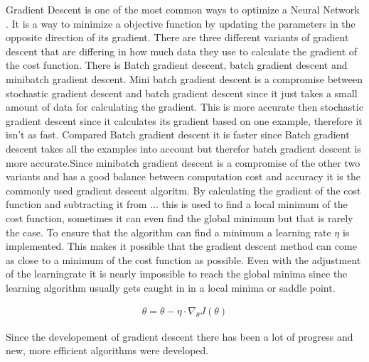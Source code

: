 \documentclass[
a4paper, 
12pt,
grayscalebody, %
abstract=on,
twoside, BCOR10mm, 12pt, DIV13,headinclude, footexclude, final, abstracton, openright
]{ibireprt}
\numberwithin{equation}{chapter}
\numberwithin{table}{chapter}
\numberwithin{figure}{chapter}
\numberwithin{algorithm}{chapter}
\numberwithin{example}{chapter}
\numberwithin{example}{chapter}
\begin{document}
Gradient Descent is one of the most common ways to optimize a Neural Network \cite{Ruder2016}. It is a way to minimize a objective function by updating the parameters in the opposite direction of its gradient. There are three different variants of gradient descent that are differing in how much data they use to calculate the gradient of the cost function. There is Batch gradient descent, batch gradient descent and minibatch gradient descent. Mini batch gradient descent is a compromise between stochastic gradient descent and batch gradient descent since it just takes a small amount of data for calculating the gradient. This is more accurate then stochastic gradient descent since it calculates its gradient based on one example, therefore it isn't as fast. Compared Batch gradient descent it is faster since Batch gradient descent takes all the examples into account but therefor batch gradient descent is more accurate.Since minibatch gradient descent is a compromise of the other two variants and has a good balance between computation cost and accuracy it is the commonly used gradient descent algoritm. By calculating the gradient of the cost function and subtracting it from ... %
 this is used to find a local minimum of the cost function, sometimes it can even find the global minimum but that is rarely the case. To ensure that the algorithm can find a minimum a learning rate $\eta$ is implemented. This makes it possible that the gradient descent method can come as close to a minimum of the cost function as possible. Even with the adjustment of the learningrate it is nearly impossible to reach the global minima since the learning algorithm usually gets caught in in a local minima or saddle point.
 
\begin{align}
	\theta = \theta - \eta \cdot \nabla_\theta J(\theta)
\end{align}


 Since the developement of gradient descent there has been a lot of progress and new, more efficient algorithms were developed. 
\end{document}
